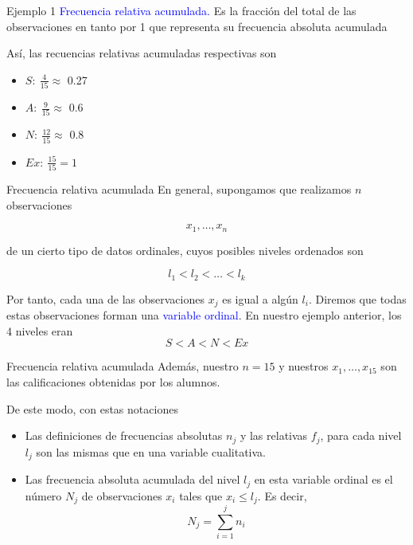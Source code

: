 \documentclass[
  ignorenonframetext,
]{beamer}
\providecommand{\tightlist}{%
  \setlength{\itemsep}{0pt}\setlength{\parskip}{0pt}}
\newcommand\blue[1]{\textcolor{blue}{#1}}
\begin{document}
\begin{frame}{Ejemplo 1}
\label{ejemplo-1-7}
\blue{
Frecuencia relativa acumulada.
} Es la fracción del total de las observaciones en tanto por 1 que
representa su frecuencia absoluta acumulada

Así, las recuencias relativas acumuladas respectivas son

\begin{itemize}
\tightlist
\item
  \(S:\ \frac{4}{15} \approx\) 0.27
\item
  \(A:\ \frac{9}{15}\approx\) 0.6
\item
  \(N:\ \frac{12}{15}\approx\) 0.8
\item
  \(Ex:\ \frac{15}{15}=1\)
\end{itemize}
\end{frame}

\begin{frame}{Frecuencia relativa acumulada}
\label{frecuencia-relativa-acumulada-4}
En general, supongamos que realizamos \(n\) observaciones

\[x_1,\dots,x_n\]

de un cierto tipo de datos ordinales, cuyos posibles niveles ordenados
son

\[l_1<l_2<\dots<l_k\]

Por tanto, cada una de las observaciones \(x_j\) es igual a algún
\(l_i\). Diremos que todas estas observaciones forman una
\blue{variable ordinal}. En nuestro ejemplo anterior, los 4 niveles eran
\[S<A<N<Ex\]
\end{frame}

\begin{frame}{Frecuencia relativa acumulada}
\label{frecuencia-relativa-acumulada-5}
Además, nuestro \(n = 15\) y nuestros \(x_1,\dots,x_{15}\) son las
calificaciones obtenidas por los alumnos.

De este modo, con estas notaciones

\begin{itemize}
\tightlist
\item
  Las definiciones de frecuencias absolutas \(n_j\) y las relativas
  \(f_j\), para cada nivel \(l_j\) son las mismas que en una variable
  cualitativa.
\item
  Las frecuencia absoluta acumulada del nivel \(l_j\) en esta variable
  ordinal es el número \(N_j\) de observaciones \(x_i\) tales que
  \(x_i\le l_j\). Es decir, \[N_j=\sum_{i=1}^jn_i\]
\end{itemize}
\end{frame}
\end{document}
